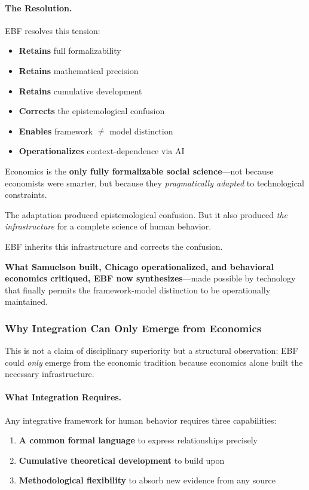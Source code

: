 \paragraph{The Resolution.}

EBF resolves this tension:
\begin{itemize}[nosep]
    \item \textbf{Retains} full formalizability
    \item \textbf{Retains} mathematical precision
    \item \textbf{Retains} cumulative development
    \item \textbf{Corrects} the epistemological confusion
    \item \textbf{Enables} framework $\neq$ model distinction
    \item \textbf{Operationalizes} context-dependence via AI
\end{itemize}

\begin{tcolorbox}[colback=green!5!white, colframe=green!75!black,
    title=\textbf{The Synthesis}]

Economics is the \textbf{only fully formalizable social science}---not because
economists were smarter, but because they \textit{pragmatically adapted} to
technological constraints.

The adaptation produced epistemological confusion. But it also produced
\textit{the infrastructure} for a complete science of human behavior.

EBF inherits this infrastructure and corrects the confusion.

\textbf{What Samuelson built, Chicago operationalized, and behavioral economics
critiqued, EBF now synthesizes}---made possible by technology that finally
permits the framework-model distinction to be operationally maintained.
\end{tcolorbox}

\subsubsection{Why Integration Can Only Emerge from Economics}

This is not a claim of disciplinary superiority but a structural observation:
EBF could \emph{only} emerge from the economic tradition because economics alone
built the necessary infrastructure.

\paragraph{What Integration Requires.}
Any integrative framework for human behavior requires three capabilities:
\begin{enumerate}[nosep]
    \item \textbf{A common formal language} to express relationships precisely
    \item \textbf{Cumulative theoretical development} to build upon
    \item \textbf{Methodological flexibility} to absorb new evidence from any source
\end{enumerate}

